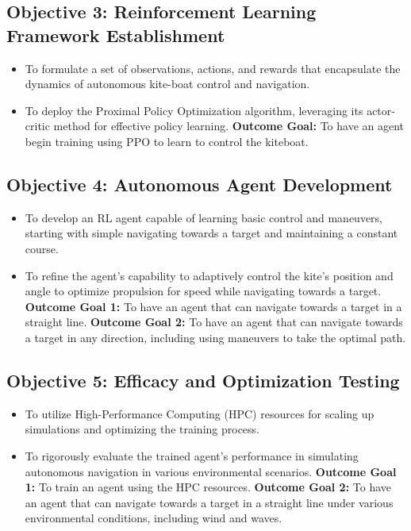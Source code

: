 \subsection*{Objective 3: Reinforcement Learning Framework Establishment}
\begin{itemize}
    \item To formulate a set of observations, actions, and rewards that encapsulate the dynamics of autonomous kite-boat control and navigation.
    \item To deploy the Proximal Policy Optimization algorithm, leveraging its actor-critic method for effective policy learning.
    \newline\textbf{Outcome Goal:} To have an agent begin training using PPO to learn to control the kiteboat.
\end{itemize}

\subsection*{Objective 4: Autonomous Agent Development}
\begin{itemize}
    \item To develop an RL agent capable of learning basic control and maneuvers, starting with simple navigating towards a target and maintaining a constant course.
    \item To refine the agent's capability to adaptively control the kite's position and angle to optimize propulsion for speed while navigating towards a target.
    \newline\textbf{Outcome Goal 1:} To have an agent that can navigate towards a target in a straight line.
    \newline\textbf{Outcome Goal 2:} To have an agent that can navigate towards a target in any direction, including using maneuvers to take the optimal path.
\end{itemize}

\subsection*{Objective 5: Efficacy and Optimization Testing}
\begin{itemize}
    \item To utilize High-Performance Computing (HPC) resources for scaling up simulations and optimizing the training process.
    \item To rigorously evaluate the trained agent’s performance in simulating autonomous navigation in various environmental scenarios.
    \newline\textbf{Outcome Goal 1:} To train an agent using the HPC resources.
    \newline\textbf{Outcome Goal 2:} To have an agent that can navigate towards a target in a straight line under various environmental conditions, including wind and waves.
\end{itemize}

